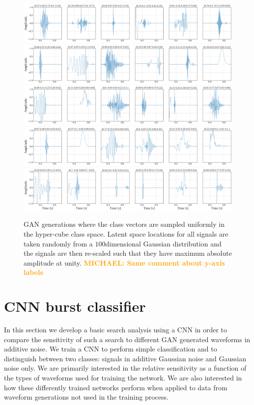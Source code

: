 \documentclass[12pt]{iopart}
\newcommand{\michael}[1]{\textbf{\textcolor{orange}{MICHAEL: #1}}}
\newcommand{\ndimensional}[1]{$#1$\nobreakdash\discretionary{-}{-}{-}dimensional}
\begin{document}
\begin{figure}
    \centering
    \includegraphics[width=\textwidth]{figures/generations/uniform_sample1.png}
    \includegraphics[width=\textwidth]{figures/generations/uniform_sample2.png}
    \includegraphics[width=\textwidth]{figures/generations/uniform_sample3.png}
    \includegraphics[width=\textwidth]{figures/generations/uniform_sample4.png}
    \includegraphics[width=\textwidth]{figures/generations/uniform_sample5.png}
    \caption{GAN generations where the class vectors are sampled uniformly in the hyper-cube class space. Latent space locations for all signals are taken randomly from a \ndimensional{100} Gaussian distribution and the signals are then re-scaled such that they have maximum absolute amplitude at unity. \michael{Same comment about y-axis labels}}
    \label{fig:uniform_samples}
\end{figure}

\section{CNN burst classifier} \label{cnn classifier}
In this section we develop a basic search analysis using a \ac{CNN} in order to compare the sensitivity of such a search to different \ac{GAN} generated waveforms in additive noise. We train a \ac{CNN} to perform simple classification and to distinguish between two classes: signals in additive Gaussian noise and Gaussian noise only. We are primarily interested in the relative sensitivity as a function of the types of waveforms used for training the network. We are also interested in how these differently trained networks perform when applied to data from waveform generations not used in the training process.
\end{document}

